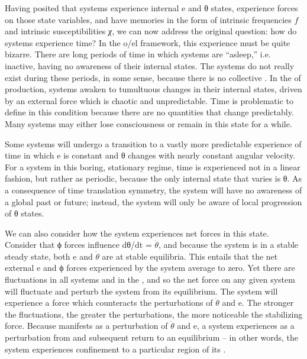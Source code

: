   Having posited that systems experience internal e and θ states, experience forces on those state variables, and have memories in the form of intrinsic frequencies $f$ and intrinsic susceptibilities \textit{χ}, we can now address the original question: how do systems experience time? In the o/el framework, this experience must be quite bizarre. There are long periods of time in which systems are “a\-sleep,” i.e. inactive, having no awareness of their internal states. The systems do not really exist during these periods, in some sense, because there is no collective . In the  of production, systems awaken to tumultuous changes in their internal states, driven by an external force which is chaotic and unpredictable. Time is problematic to define in this condition because there are no quantities that change predictably. Many systems may either lose consciousness or remain in this state for a while. 

  Some systems will undergo a transition to a vastly more predictable experience of time in which e is constant and θ changes with nearly constant angular velocity. For a system in this boring, stationary regime, time is experienced not in a linear fashion, but rather as periodic, because the only internal state that varies is θ. As a consequence of time translation symmetry, the system will have no awareness of a global past or future; instead, the system will only be aware of local progression of θ states. 

  We can also consider how the system experiences net forces in this state. Consider that ϕ forces influence  dθ/dt = $\dot{\theta}$, and because the system is in a stable steady state, both e and $\dot{\theta}$ are at stable equilibria. This entails that the net external e and ϕ forces experienced by the system average to zero. Yet there are fluctuations in all systems and in the , and so the net force on any given system will fluctuate and perturb the system from its equilibrium. The system will experience a force which counteracts the perturbations of $\dot{\theta}$ and e. The stronger the fluctuations, the greater the perturbations, the more noticeable the stabilizing force. Because  manifests as a perturbation of $\dot{\theta}$ and e, a system experiences  as a perturbation from and subsequent return to an equilibrium -- in other words, the system experiences confinement to a particular region of its .

